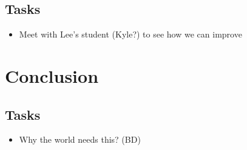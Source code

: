 \documentclass[12pt]{article}
\begin{document}
\subsection{Tasks}

\begin{itemize}
\item Meet with Lee's student (Kyle?) to see how we can improve
\end{itemize}


\section{Conclusion}

\subsection{Tasks}

\begin{itemize}
\item Why the world needs this? (BD)
\end{itemize}


\clearpage
\singlespace

\nocite{*}

\clearpage
\end{document}
